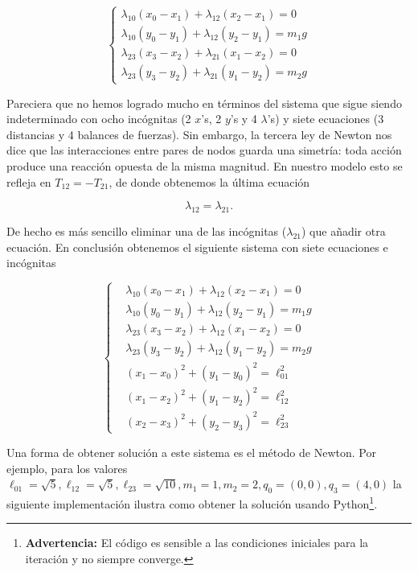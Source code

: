 \documentclass[
]{book}
\theoremstyle{definition}
\theoremstyle{definition}
\theoremstyle{definition}
\theoremstyle{definition}
\theoremstyle{remark}
\begin{document}
\[
\begin{cases}
\lambda_{10}(x_{0}-x_{1})+\lambda_{12}(x_{2}-x_{1}) = 0\\
\lambda_{10}(y_{0}-y_{1})+\lambda_{12}(y_{2}-y_{1}) = m_{1}g\\
\lambda_{23}(x_{3}-x_{2})+\lambda_{21}(x_{1}-x_{2}) = 0\\
\lambda_{23}(y_{3}-y_{2})+\lambda_{21}(y_{1}-y_{2}) = m_{2}g
\end{cases}
\]

Pareciera que no hemos logrado mucho en términos del sistema que sigue siendo indeterminado con ocho incógnitas (2 \(x\)'s, 2 \(y\)'s y 4 \(\lambda\)'s) y siete ecuaciones (3 distancias y 4 balances de fuerzas). Sin embargo, la tercera ley de Newton nos dice que las interacciones entre pares de nodos guarda una simetría: toda acción produce una reacción opuesta de la misma magnitud. En nuestro modelo esto se refleja en \(T_{12} = -T_{21}\), de donde obtenemos la última ecuación

\[
\lambda_{12}=\lambda_{21}.
\]

De hecho es más sencillo eliminar una de las incógnitas (\(\lambda_{21}\)) que añadir otra ecuación. En conclusión obtenemos el siguiente sistema con siete ecuaciones e incógnitas

\[
    \begin{cases}
    &\lambda_{10}(x_{0}-x_{1})+\lambda_{12}(x_{2}-x_{1}) = 0\\
    &\lambda_{10}(y_{0}-y_{1})+\lambda_{12}(y_{2}-y_{1}) = m_{1}g\\
    &\lambda_{23}(x_{3}-x_{2})+\lambda_{12}(x_{1}-x_{2}) = 0\\
    &\lambda_{23}(y_{3}-y_{2})+\lambda_{12}(y_{1}-y_{2}) = m_{2}g\\
    &(x_1-x_0)^2 + (y_1-y_0)^2 = \ell_{01}^2\\
    &(x_1-x_2)^2 + (y_1-y_2)^2 = \ell_{12}^2\\
    &(x_2-x_3)^2 + (y_2-y_3)^2 = \ell_{23}^2
    \end{cases}
\]

Una forma de obtener solución a este sistema es el método de Newton. Por ejemplo, para los valores \(\ell_{01}=\sqrt{5}, \ell_{12}=\sqrt{5}, \ell_{23}=\sqrt{10}, m_1=1, m_2=2, q_0=(0,0), q_3=(4,0)\) la siguiente implementación ilustra como obtener la solución usando Python\footnote{\textbf{Advertencia:} El código es sensible a las condiciones iniciales para la iteración y no siempre converge.}.
\end{document}

